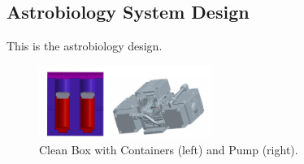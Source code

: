\newpage
\subsection{Astrobiology System Design}
\label{sec:Astrobiology Design}
This is the astrobiology design.

\begin{figure}[H]
	\begin{center}
		\includegraphics[width=0.5\textwidth]{figures/Astro_Figs.pdf}
		\caption{Clean Box with Containers (left) and Pump (right).}
		\label{fig:Astrobio System}
	\end{center}
\end{figure}

